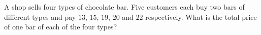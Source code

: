 A shop sells four types of chocolate bar. Five customers each buy two bars of different types and pay $13$, $15$, $19$, $20$ and $22$ respectively. What is the total price of one bar of each of the four types?

